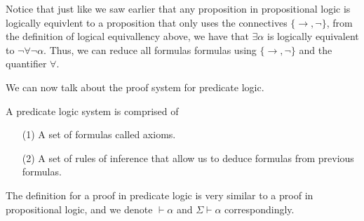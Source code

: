 \documentclass[11pt,a4paper]{article}
\renewcommand{\implies}{\rightarrow}
\begin{document}
  Notice that just like we saw earlier that any proposition in
  propositional logic is logically equivlent to a proposition that
  only uses the connectives $\{\implies, \neg\}$,
  from the definition of logical equivallency above, we have that
  $\exists \alpha$ is logically equivalent to $\neg \forall \neg \alpha$.
  Thus, we can reduce all formulas formulas using $\{\implies, \neg\}$
  and the quantifier $\forall$.

  We can now talk about the proof system for predicate logic.
  
  \begin{definition}
    A predicate logic system is comprised of
    \begin{enumerate}
      \item[(1)] A set of formulas called axioms.
      \item[(2)] A set of rules of inference that allow us to deduce
        formulas from previous formulas.
    \end{enumerate}
  \end{definition}
  
  The definition for a proof in predicate logic is very similar to a
  proof in propositional logic, and we denote $\vdash \alpha$ and
  $\Sigma \vdash \alpha$ correspondingly.
\end{document}
